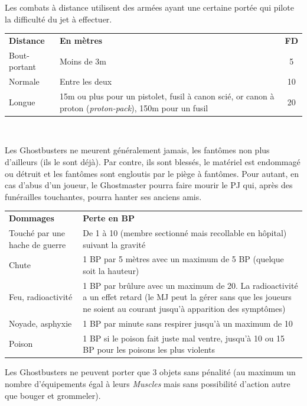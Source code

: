 \begin{frame}[b]
{\myindent Les combats à distance utilisent des armées ayant une certaine portée qui pilote la difficulté du jet à effectuer.

\begin{center}
\begin{tabular}{l p{5.5cm} c}
\textbf{Distance} & \textbf{En mètres} & \textbf{FD} \\
Bout-portant & Moins de 3m & 5 \\
Normale & Entre les deux & 10 \\ 
Longue & 15m ou plus pour un pistolet, fusil à canon scié, or canon à proton (\textit{proton-pack}), 150m pour un fusil &  20 \\
\end{tabular} \\
\end{center}


\myindent Les Ghostbusters ne meurent généralement jamais, les fantômes non plus d'ailleurs (ils le sont déjà). Par contre, ils sont blessés, le matériel est endommagé ou détruit et les fantômes sont engloutis par le piège à fantômes. Pour autant, en cas d'abus d'un joueur, le Ghostmaster pourra faire mourir le PJ qui, après des funérailles touchantes, pourra hanter ses anciens amis.

\begin{center}
\begin{tabular}{p{2cm} p{6cm}}
\textbf{Dommages} & \textbf{Perte en BP}\\
Touché par une hache de guerre & De 1 à 10 (membre sectionné mais recollable en hôpital) suivant la gravité \\
Chute & 1 BP par 5 mètres avec un maximum de 5 BP (quelque soit la hauteur) \\
Feu, radioactivité & 1 BP par brûlure avec un maximum de 20. La radioactivité a un effet retard (le MJ peut la gérer sans que les joueurs ne soient au courant jusqu'à apparition des symptômes) \\
Noyade, asphyxie & 1 BP par minute sans respirer jusqu'à un maximum de 10 \\
Poison & 1 BP si le poison fait juste mal ventre, jusqu'à 10 ou 15 BP pour les poisons les plus violents \\
\end{tabular}
\end{center}


\myindent Les Ghostbusters ne peuvent porter que 3 objets sans pénalité (au maximum un nombre d'équipements égal à leurs \textit{Muscles} mais sans possibilité d'action autre que bouger et grommeler).



}
\end{frame}

